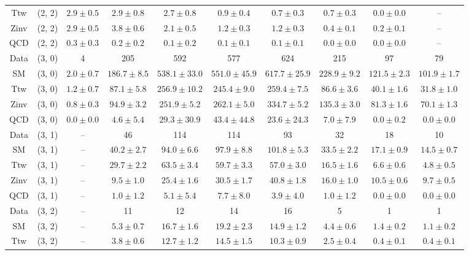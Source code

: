 \begin{table}[h!]
{\begin{tabular}{cccccccccc}
	Ttw & (2, 2) & $2.9\pm 0.5$ & $2.9\pm 0.8$ & $2.7\pm 0.8$ & $0.9\pm 0.4$ & $0.7\pm 0.3$ & $0.7\pm 0.3$ & $0.0\pm 0.0$ & -- \\[0.5ex] 
	Zinv & (2, 2) & $2.9\pm 0.5$ & $3.8\pm 0.6$ & $2.1\pm 0.5$ & $1.2\pm 0.3$ & $1.2\pm 0.3$ & $0.4\pm 0.1$ & $0.2\pm 0.1$ & -- \\[0.5ex] 
	QCD & (2, 2) & $0.3\pm 0.3$ & $0.2\pm 0.2$ & $0.1\pm 0.2$ & $0.1\pm 0.1$ & $0.1\pm 0.1$ & $0.0\pm 0.0$ & $0.0\pm 0.0$ & -- \\[0.5ex] 
	Data & (3, 0) & 4 & 205 & 592 & 577 & 624 & 215 & 97 & 79 \\[0.5ex] 
	SM & (3, 0) & $2.0\pm 0.7$ & $186.7\pm 8.5$ & $538.1\pm 33.0$ & $551.0\pm 45.9$ & $617.7\pm 25.9$ & $228.9\pm 9.2$ & $121.5\pm 2.3$ & $101.9\pm 1.7$ \\[0.5ex] 
	Ttw & (3, 0) & $1.2\pm 0.7$ & $87.1\pm 5.8$ & $256.9\pm 10.2$ & $245.4\pm 9.0$ & $259.4\pm 7.5$ & $86.6\pm 3.6$ & $40.1\pm 1.6$ & $31.8\pm 1.0$ \\[0.5ex] 
	Zinv & (3, 0) & $0.8\pm 0.3$ & $94.9\pm 3.2$ & $251.9\pm 5.2$ & $262.1\pm 5.0$ & $334.7\pm 5.2$ & $135.3\pm 3.0$ & $81.3\pm 1.6$ & $70.1\pm 1.3$ \\[0.5ex] 
	QCD & (3, 0) & $0.0\pm 0.0$ & $4.6\pm 5.4$ & $29.3\pm 30.9$ & $43.4\pm 44.8$ & $23.6\pm 24.3$ & $7.0\pm 7.9$ & $0.0\pm 0.2$ & $0.0\pm 0.0$ \\[0.5ex] 
	Data & (3, 1) & -- & 46 & 114 & 114 & 93 & 32 & 18 & 10 \\[0.5ex] 
	SM & (3, 1) & -- & $40.2\pm 2.7$ & $94.0\pm 6.6$ & $97.9\pm 8.8$ & $101.8\pm 5.3$ & $33.5\pm 2.2$ & $17.1\pm 0.9$ & $14.5\pm 0.7$ \\[0.5ex] 
	Ttw & (3, 1) & -- & $29.7\pm 2.2$ & $63.5\pm 3.4$ & $59.7\pm 3.3$ & $57.0\pm 3.0$ & $16.5\pm 1.6$ & $6.6\pm 0.6$ & $4.8\pm 0.5$ \\[0.5ex] 
	Zinv & (3, 1) & -- & $9.5\pm 1.0$ & $25.4\pm 1.6$ & $30.5\pm 1.7$ & $40.8\pm 1.8$ & $16.0\pm 1.0$ & $10.5\pm 0.6$ & $9.7\pm 0.5$ \\[0.5ex] 
	QCD & (3, 1) & -- & $1.0\pm 1.2$ & $5.1\pm 5.4$ & $7.7\pm 8.0$ & $3.9\pm 4.0$ & $1.0\pm 1.2$ & $0.0\pm 0.0$ & $0.0\pm 0.0$ \\[0.5ex] 
	Data & (3, 2) & -- & 11 & 12 & 14 & 16 & 5 & 1 & 1 \\[0.5ex] 
	SM & (3, 2) & -- & $5.3\pm 0.7$ & $16.7\pm 1.6$ & $19.2\pm 2.3$ & $14.9\pm 1.2$ & $4.4\pm 0.6$ & $1.4\pm 0.2$ & $1.1\pm 0.2$ \\[0.5ex] 
	Ttw & (3, 2) & -- & $3.8\pm 0.6$ & $12.7\pm 1.2$ & $14.5\pm 1.5$ & $10.3\pm 0.9$ & $2.5\pm 0.4$ & $0.4\pm 0.1$ & $0.4\pm 0.1$ \\[0.5ex] 

\end{tabular}}
\end{table}
